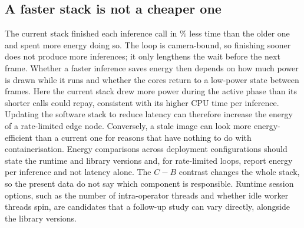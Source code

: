 \documentclass[10pt,journal,compsoc]{IEEEtran}
\begin{document}
\subsection{A faster stack is not a cheaper one}
The current stack finished each inference call in \StackTimeSavedPct\% less time than the older one and spent more energy doing so. The loop is camera-bound, so finishing sooner does not produce more inferences; it only lengthens the wait before the next frame. Whether a faster inference saves energy then depends on how much power is drawn while it runs and whether the cores return to a low-power state between frames. Here the current stack drew more power during the active phase than its shorter calls could repay, consistent with its higher CPU time per inference. Updating the software stack to reduce latency can therefore increase the energy of a rate-limited edge node. Conversely, a stale image can look more energy-efficient than a current one for reasons that have nothing to do with containerisation. Energy comparisons across deployment configurations should state the runtime and library versions and, for rate-limited loops, report energy per inference and not latency alone. The $C-B$ contrast changes the whole stack, so the present data do not say which component is responsible. Runtime session options, such as the number of intra-operator threads and whether idle worker threads spin, are candidates that a follow-up study can vary directly, alongside the library versions.
\end{document}
